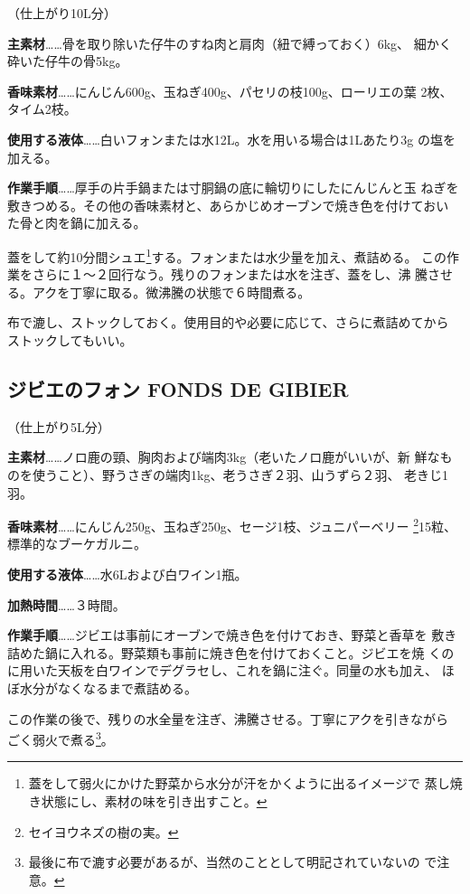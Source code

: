\documentclass[twoside,12Q,b5paper,tombo]{escoffierltjsbook}
\newenvironment{recette}{\begin{multicols}{2}}{\end{multicols}}
\begin{document}
\begin{recette}
（仕上がり10L分）

\textbf{主素材}\ldots{}\ldots{}骨を取り除いた仔牛のすね肉と肩肉（紐で縛っておく）6kg、
細かく砕いた仔牛の骨5kg。

\textbf{香味素材}\ldots{}\ldots{}にんじん600g、玉ねぎ400g、パセリの枝100g、ローリエの葉
2枚、タイム2枝。

\textbf{使用する液体}\ldots{}\ldots{}白いフォンまたは水12L。水を用いる場合は1Lあたり3g
の塩を加える。

\textbf{作業手順}\ldots{}\ldots{}厚手の片手鍋または寸胴鍋の底に輪切りにしたにんじんと玉
ねぎを敷きつめる。その他の香味素材と、あらかじめオーブンで焼き色を付けておい
た骨と肉を鍋に加える。

蓋をして約10分間シュエ\footnote{蓋をして弱火にかけた野菜から水分が汗をかくように出るイメージで
  蒸し焼き状態にし、素材の味を引き出すこと。}する。フォンまたは水少量を加え、煮詰める。
この作業をさらに１〜２回行なう。残りのフォンまたは水を注ぎ、蓋をし、沸
騰させる。アクを丁寧に取る。微沸騰の状態で６時間煮る。

布で漉し、ストックしておく。使用目的や必要に応じて、さらに煮詰めてから
ストックしてもいい。

\subsection{ジビエのフォン FONDS DE
GIBIER}\label{ux30b8ux30d3ux30a8ux306eux30d5ux30a9ux30f3-fonds-de-gibier}

（仕上がり5L分）

\textbf{主素材}\ldots{}\ldots{}ノロ鹿の頸、胸肉および端肉3kg（老いたノロ鹿がいいが、新
鮮なものを使うこと）、野うさぎの端肉1kg、老うさぎ２羽、山うずら２羽、
老きじ1羽。

\textbf{香味素材}\ldots{}\ldots{}にんじん250g、玉ねぎ250g、セージ1枝、ジュニパーベリー
\footnote{セイヨウネズの樹の実。}15粒、標準的なブーケガルニ。

\textbf{使用する液体}\ldots{}\ldots{}水6Lおよび白ワイン1瓶。

\textbf{加熱時間}\ldots{}\ldots{}３時間。

\textbf{作業手順}\ldots{}\ldots{}ジビエは事前にオーブンで焼き色を付けておき、野菜と香草を
敷き詰めた鍋に入れる。野菜類も事前に焼き色を付けておくこと。ジビエを焼
くのに用いた天板を白ワインでデグラセし、これを鍋に注ぐ。同量の水も加え、
ほぼ水分がなくなるまで煮詰める。

この作業の後で、残りの水全量を注ぎ、沸騰させる。丁寧にアクを引きながら
ごく弱火で煮る\footnote{最後に布で漉す必要があるが、当然のこととして明記されていないの
  で注意。}。


\end{recette}
\end{document}

